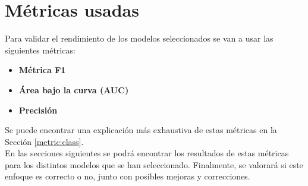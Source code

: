 \section{Métricas usadas}
Para validar el rendimiento de los modelos seleccionados se van a usar las siguientes métricas:
\begin{itemize}
	 \item \textbf{Métrica F1}
	 \item \textbf{Área bajo la curva (AUC)}
	 \item \textbf{Precisión}
\end{itemize}
Se puede encontrar una explicación más exhaustiva de estas métricas en la Sección \ref{metric:class}.\\
\linebreak
En las secciones siguientes se podrá encontrar los resultados de estas métricas para los distintos modelos que se han seleccionado. Finalmente, se valorará si este enfoque es correcto o no, junto con posibles mejoras y correcciones.
\clearpage
